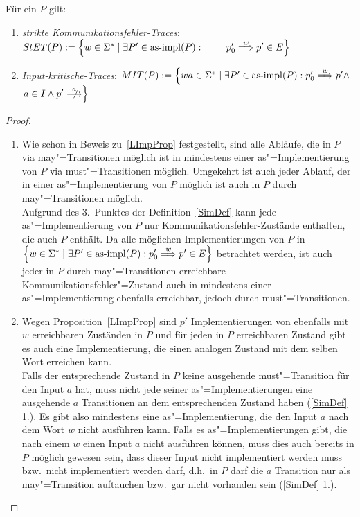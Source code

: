 \begin{Prop}
  Für ein \MEIO{} $P$ gilt:
  \begin{enumerate}
    \item \emph{strikte Kommunikationsfehler-Traces}: $\StET (P) :=
      \left\{w\in\Sigma ^* \mid \exists P' \in\asimp (P) :
      \phantom{\weakmust[w]} \right.$ $\left. p'_0 \weakmust[w] p' \in
      E\right\}$ 
    \item \emph{Input-kritische-Traces}: $\MIT (P) := \left\{wa\in\Sigma ^* \mid
      \exists P' \in\asimp (P) : p'_0
      \weakmust[w] p' \land \right.$\linebreak $\left. a\in I\land p'\nmust[a]
      \right\}$ 
  \end{enumerate}
\end{Prop}
\begin{proof}\mbox{}
  \begin{enumerate}
    \item Wie schon in Beweis zu~\ref{LImpProp} festgestellt, sind alle
      Abläufe, die in $P$ via may"=Transitionen möglich ist in mindestens einer
      as"=Implementierung von $P$ via must"=Transitionen möglich. Umgekehrt ist
      auch jeder Ablauf, der in einer as"=Implementierung von $P$ möglich ist
      auch in $P$ durch may"=Transitionen möglich.\\
      Aufgrund des 3.\ Punktes der Definition~\ref{SimDef} kann jede
      as"=Implementierung von $P$ nur Kommunikationsfehler-Zustände enthalten,
      die auch $P$ enthält. Da alle möglichen Implementierungen von $P$ in
      $\left\{w\in\Sigma ^* \mid \exists P' \in\asimp (P) : p'_0 \weakmust[w]
      p' \in E\right\}$ betrachtet werden, ist auch jeder in $P$ durch
      may"=Transitionen erreichbare Kommunikationsfehler"=Zustand auch in
      mindestens einer as"=Implementierung ebenfalls erreichbar, jedoch durch
      must"=Transitionen.
    \item Wegen Proposition~\ref{LImpProp} sind $p'$ Implementierungen von
      ebenfalls mit $w$ erreichbaren Zuständen in $P$ und für jeden in $P$
      erreichbaren Zustand gibt es auch eine Implementierung, die einen
      analogen Zustand mit dem selben Wort erreichen kann.\\
      Falls der entsprechende Zustand in $P$ keine ausgehende must"=Transition
      für den Input $a$ hat, muss nicht jede seiner as"=Implementierungen eine
      ausgehende $a$ Transitionen an dem entsprechenden Zustand haben
      (\ref{SimDef} 1.). Es gibt also mindestens eine as"=Implementierung, die
      den Input $a$ nach dem Wort $w$ nicht ausführen kann. Falls es
      as"=Implementierungen gibt, die nach einem $w$ einen Input $a$ nicht
      ausführen können, muss dies auch bereits in $P$ möglich gewesen sein,
      dass dieser Input nicht implementiert werden muss bzw.\ nicht
      implementiert werden darf, d.h.\ in $P$ darf die $a$ Transition nur als
      may"=Transition auftauchen bzw.\ gar nicht vorhanden sein (\ref{SimDef}
      1.).
  \end{enumerate}
\end{proof}

